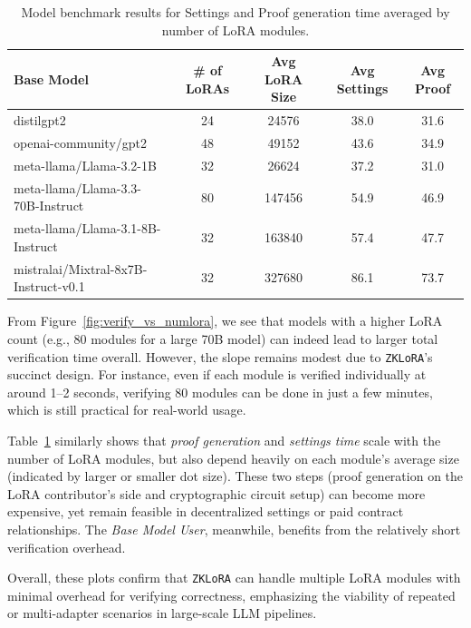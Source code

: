 \documentclass[11pt]{article}
\begin{document}
\begin{table}[h]
\centering
\begin{tabular}{lcccc}
\hline
Base Model & \# of LoRAs & Avg LoRA Size & Avg Settings & Avg Proof \\
\hline
distilgpt2 & 24 & 24576 & 38.0 & 31.6 \\
openai-community/gpt2 & 48 & 49152 & 43.6 & 34.9 \\
meta-llama/Llama-3.2-1B & 32 & 26624 & 37.2 & 31.0 \\
meta-llama/Llama-3.3-70B-Instruct & 80 & 147456 & 54.9 & 46.9 \\
meta-llama/Llama-3.1-8B-Instruct & 32 & 163840 & 57.4 & 47.7 \\
mistralai/Mixtral-8x7B-Instruct-v0.1 & 32 & 327680 & 86.1 & 73.7 \\
\hline
\end{tabular}
\caption{Model benchmark results for Settings and Proof generation time averaged by number of LoRA modules.}\label{tab:settings_proof}
\end{table}

From Figure~\ref{fig:verify_vs_numlora}, we see that models with a higher LoRA count (e.g., 80 modules for a large 70B model) can indeed lead to larger total verification time overall. However, the slope remains modest due to \texttt{ZKLoRA}’s succinct design. For instance, even if each module is verified individually at around 1--2 seconds, verifying 80 modules can be done in just a few minutes, which is still practical for real-world usage.

Table~\ref{tab:settings_proof} similarly shows that \emph{proof generation} and \emph{settings time} scale with the number of LoRA modules, but also depend heavily on each module’s average size (indicated by larger or smaller dot size). These two steps (proof generation on the LoRA contributor’s side and cryptographic circuit setup) can become more expensive, yet remain feasible in decentralized settings or paid contract relationships. The \emph{Base Model User}, meanwhile, benefits from the relatively short verification overhead.

Overall, these plots confirm that \texttt{ZKLoRA} can handle multiple LoRA modules with minimal overhead for verifying correctness, emphasizing the viability of repeated or multi-adapter scenarios in large-scale LLM pipelines.

\end{document}
